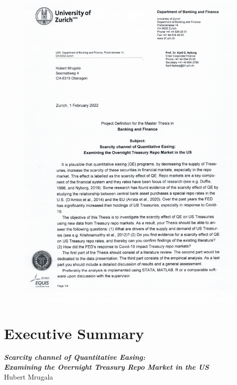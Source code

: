 \documentclass[11pt,a4paper,english,oneside]{article}
\begin{document}
\begin{figure}[h!]
  \begin{center}
    \includegraphics[page=4,width=.86\textwidth]{../../project_definition.pdf}
  \end{center}
\end{figure}

\thispagestyle{firststyle}
\newpage

\section*{Executive Summary}
\thispagestyle{firststyle}

\lipsum[1-3] %

\newpage
\tableofcontents
\newpage
\listoffigures
\newpage
\listoftables
\newpage
{}

\begin{center}
  {\Large \emph{\textbf{Scarcity channel of Quantitative Easing:\\
  Examining the Overnight Treasury Repo Market in the US}}}\\[4pt]
  Hubert Mrugala
\end{center}
\end{document}
